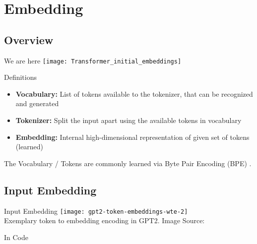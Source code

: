 \section{Embedding}
\subsection{Overview}
\begin{frame}[c]{We are here}
    \texttt{[image: Transformer\_initial\_embeddings]}
\end{frame}

\begin{frame}[c]{Definitions}
    \large
    \begin{itemize}[<+(1)->]
        \item    \textbf{Vocabulary:} List of tokens available to the tokenizer, that can be recognized and generated \\
        \item    \textbf{Tokenizer:} Split the input apart using the available tokens in vocabulary \\
        \item    \textbf{Embedding:} Internal high-dimensional representation of given set of tokens (learned) \\
    \end{itemize}
    \pause
    The Vocabulary / Tokens are commonly learned via Byte Pair
    Encoding (BPE) \cite{shibata_byte_1999}. \\
\end{frame}

\subsection{Input Embedding}
\begin{frame}[c]{Input Embedding}
    \texttt{[image: gpt2-token-embeddings-wte-2]} \\
    \large
    Exemplary token to embedding encoding in GPT2.
    \normalsize
    Image Source: \cite{alammar_illustrated_2019}
\end{frame}

\begin{frame}[c]{In Code}
    \inputminted{python}{code/embedding.py}
\end{frame}


